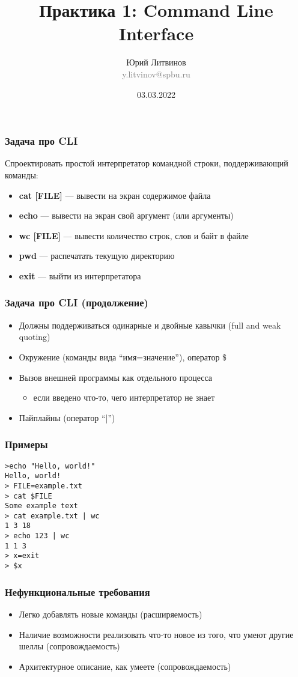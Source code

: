\documentclass[xetex,mathserif,serif]{beamer}
\title{Практика 1: Command Line Interface}
\author[Юрий Литвинов]{Юрий Литвинов\\\small{\textcolor{gray}{y.litvinov@spbu.ru}}}
\date{03.03.2022}
\begin{document}
    \frame{\titlepage}

    \begin{frame}
        \frametitle{Задача про CLI}
        Спроектировать простой интерпретатор командной строки, поддерживающий команды:
        \begin{itemize}
            \item \textbf{cat [FILE]} --- вывести на экран содержимое файла
            \item \textbf{echo} --- вывести на экран свой аргумент (или аргументы)
            \item \textbf{wc [FILE]} --- вывести количество строк, слов и байт в файле
            \item \textbf{pwd} --- распечатать текущую директорию
            \item \textbf{exit} --- выйти из интерпретатора
        \end{itemize}
    \end{frame}
    
    \begin{frame}
        \frametitle{Задача про CLI (продолжение)}
        \begin{itemize}
            \item Должны поддерживаться одинарные и двойные кавычки (full and weak quoting)
            \item Окружение (команды вида ``имя=значение''), оператор \$
            \item Вызов внешней программы как отдельного процесса
            \begin{itemize}
                \item если введено что-то, чего интерпретатор не знает
            \end{itemize}
            \item Пайплайны (оператор ``|'')
        \end{itemize}
    \end{frame}
    
    \begin{frame}[fragile]
        \frametitle{Примеры}
\begin{verbatim}
>echo "Hello, world!"
Hello, world!
> FILE=example.txt
> cat $FILE
Some example text
> cat example.txt | wc
1 3 18
> echo 123 | wc
1 1 3
> x=exit
> $x
        \end{verbatim}
    \end{frame}

    \begin{frame}
        \frametitle{Нефункциональные требования}
        \begin{itemize}
            \item Легко добавлять новые команды (расширяемость)
            \item Наличие возможности реализовать что-то новое из того, что умеют другие шеллы (сопровождаемость)
            \item Архитектурное описание, как умеете (сопровождаемость)
        \end{itemize}
    \end{frame}
    
\end{document}
